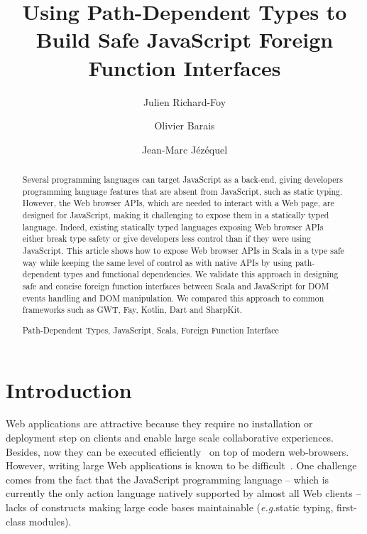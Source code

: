 \documentclass[runningheads,a4paper]{llncs}
\newcommand{\keywords}[1]{\par\addvspace\baselineskip
\noindent\keywordname\enspace\ignorespaces#1}
\newcommand{\eg}{\emph{e.g.}}
\begin{document}
\mainmatter

\title{Using Path-Dependent Types to Build Safe JavaScript Foreign Function Interfaces}

\author{Julien Richard-Foy \and Olivier Barais\and Jean-Marc Jézéquel}


\maketitle


\begin{abstract}
Several programming languages can target JavaScript as a back-end, giving developers programming language features
that are absent from JavaScript, such as static typing. However, the Web browser APIs, which are needed to interact
with a Web page, are designed for JavaScript, making it challenging to expose them in a statically typed language.
Indeed, existing statically typed languages exposing Web browser APIs either break type safety or give developers
less control than if they were using JavaScript. This article shows how to expose Web browser APIs in Scala in a
type safe way while keeping the same level of control as with native APIs by using path-dependent types and
functional dependencies. We validate this approach in designing safe and concise foreign function interfaces between
Scala and JavaScript for DOM events handling and DOM manipulation. We compared this approach to common frameworks
such as GWT, Fay, Kotlin, Dart and SharpKit.
\keywords{Path-Dependent Types, JavaScript, Scala, Foreign Function Interface}
\end{abstract}


\section{Introduction}

Web applications are attractive because they require no installation or deployment step on clients and enable large
scale collaborative experiences. Besides, now they can be executed efficiently~\cite{Gal:2009:TJT:1542476.1542528} on
top of modern web-browsers. However, writing large Web applications is known to be
difficult~\cite{Mikkonen08_SpaghettiJs,Preciado05_RIAMethodologyNecessity}. One challenge comes from the fact that
the JavaScript programming language -- which is currently the only action language natively supported by almost all
Web clients -- lacks of constructs making large code bases maintainable (\eg static typing, first-class modules).
\end{document}
